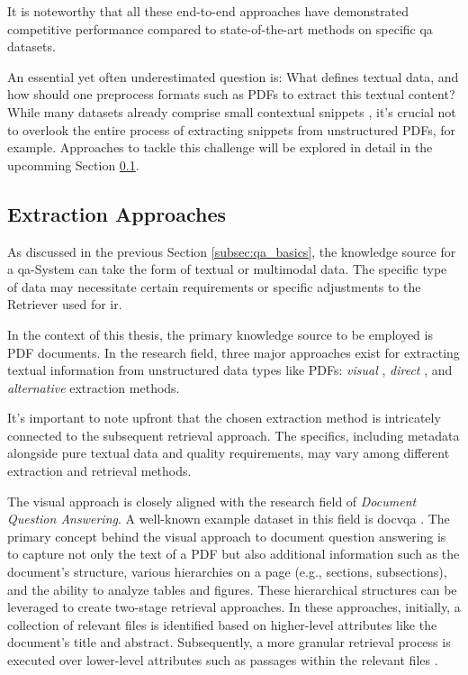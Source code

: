 It is noteworthy that all these end-to-end approaches have demonstrated competitive performance compared to state-of-the-art methods on specific \gls{qa} datasets.

An essential yet often underestimated question is: What defines textual data, and how should one preprocess formats such as PDFs to extract this textual content? While many datasets already comprise small contextual snippets \cite{wang_modern_2022}, it's crucial not to overlook the entire process of extracting snippets from unstructured PDFs, for example. Approaches to tackle this challenge will be explored in detail in the upcomming Section \ref{subsec:qa_indexing}.


\subsection{Extraction Approaches}
\label{subsec:qa_indexing}

As discussed in the previous Section \ref{subsec:qa_basics}, the knowledge source for a \gls{qa}-System can take the form of textual or multimodal data. The specific type of data may necessitate certain requirements or specific adjustments to the Retriever used for \gls{ir}.

In the context of this thesis, the primary knowledge source to be employed is PDF documents. In the research field, three major approaches exist for extracting textual information from unstructured data types like PDFs: \textit{visual} \cite{tito_document_2021}, \textit{direct} \cite{wang_multi-passage_2019}, and \textit{alternative} \cite{dasigi_dataset_2021} extraction methods.

It's important to note upfront that the chosen extraction method is intricately connected to the subsequent retrieval approach. The specifics, including metadata alongside pure textual data and quality requirements, may vary among different extraction and retrieval methods.

The visual approach is closely aligned with the research field of \textit{Document Question Answering}. A well-known example dataset in this field is \gls{docvqa} \cite{tito_document_2021}. The primary concept behind the visual approach to document question answering is to capture not only the text of a PDF but also additional information such as the document's structure, various hierarchies on a page (e.g., sections, subsections), and the ability to analyze tables and figures. These hierarchical structures can be leveraged to create two-stage retrieval approaches. In these approaches, initially, a collection of relevant files is identified based on higher-level attributes like the document's title and abstract. Subsequently, a more granular retrieval process is executed over lower-level attributes such as passages within the relevant files \cite{liu_dense_2021}.

